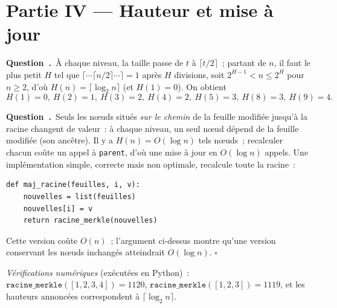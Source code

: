 \documentclass[11pt,a4paper]{article}
\newcounter{qcnt}
\newcommand{\Q}{\medskip\par\stepcounter{qcnt}\noindent\textbf{Question~\theqcnt.}~}
\newcommand{\code}[1]{\lstinline!#1!}
\begin{document}
\section*{Partie IV --- Hauteur et mise à jour}

\Q À chaque niveau, la taille passe de $t$ à $\lceil t/2\rceil$~; partant de $n$, il faut le plus
petit $H$ tel que $\lceil\cdots\lceil n/2\rceil\cdots\rceil = 1$ après $H$ divisions, soit
$2^{H-1} < n \le 2^{H}$ pour $n \ge 2$, d'où $H(n)=\lceil\log_2 n\rceil$ (et $H(1)=0$). On obtient
$$H(1)=0,\ H(2)=1,\ H(3)=2,\ H(4)=2,\ H(5)=3,\ H(8)=3,\ H(9)=4.$$

\Q Seuls les n\oe uds situés \emph{sur le chemin} de la feuille modifiée jusqu'à la racine
changent de valeur~: à chaque niveau, un seul n\oe ud dépend de la feuille modifiée (son
ancêtre). Il y a $H(n)=O(\log n)$ tels n\oe uds~; recalculer chacun coûte un appel à \code{parent},
d'où une mise à jour en $O(\log n)$ appels. Une implémentation simple, correcte mais non
optimale, recalcule toute la racine~:
\begin{lstlisting}
def maj_racine(feuilles, i, v):
    nouvelles = list(feuilles)
    nouvelles[i] = v
    return racine_merkle(nouvelles)
\end{lstlisting}
Cette version coûte $O(n)$~; l'argument ci-dessus montre qu'une version conservant les n\oe uds
inchangés atteindrait $O(\log n)$. $\square$

\medskip
\noindent\emph{Vérifications numériques} (exécutées en Python)~: $\mathtt{racine\_merkle}([1,2,3,4])
=1120$, $\mathtt{racine\_merkle}([1,2,3])=1119$, et les hauteurs annoncées correspondent à
$\lceil\log_2 n\rceil$.
\end{document}
